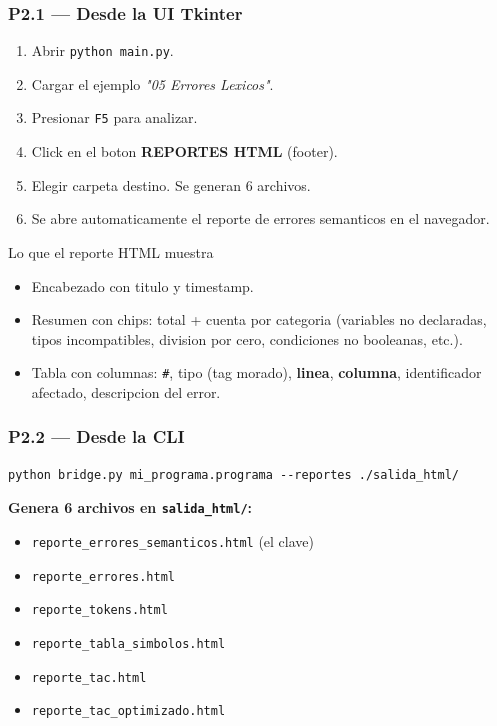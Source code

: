 \documentclass[11pt,a4paper]{article}
\begin{document}
\subsubsection{P2.1 --- Desde la UI Tkinter}

\begin{enumerate}[leftmargin=*,nosep]
  \item Abrir \texttt{python main.py}.
  \item Cargar el ejemplo \emph{"05 Errores Lexicos"}.
  \item Presionar \texttt{F5} para analizar.
  \item Click en el boton \textbf{REPORTES HTML} (footer).
  \item Elegir carpeta destino. Se generan 6 archivos.
  \item Se abre automaticamente el reporte de errores semanticos en
        el navegador.
\end{enumerate}

\begin{prueba}{Lo que el reporte HTML muestra}
\begin{itemize}[leftmargin=*,nosep]
  \item Encabezado con titulo y timestamp.
  \item Resumen con chips: total + cuenta por categoria (variables
        no declaradas, tipos incompatibles, division por cero,
        condiciones no booleanas, etc.).
  \item Tabla con columnas: \texttt{\#}, tipo (tag morado),
        \textbf{linea}, \textbf{columna}, identificador afectado,
        descripcion del error.
\end{itemize}
\end{prueba}

\subsubsection{P2.2 --- Desde la CLI}

\begin{lstlisting}[style=tac]
python bridge.py mi_programa.programa --reportes ./salida_html/
\end{lstlisting}

\textbf{Genera 6 archivos en \texttt{salida\_html/}:}
\begin{itemize}[leftmargin=*,nosep]
  \item \texttt{reporte\_errores\_semanticos.html} (el clave)
  \item \texttt{reporte\_errores.html}
  \item \texttt{reporte\_tokens.html}
  \item \texttt{reporte\_tabla\_simbolos.html}
  \item \texttt{reporte\_tac.html}
  \item \texttt{reporte\_tac\_optimizado.html}
\end{itemize}
\end{document}
